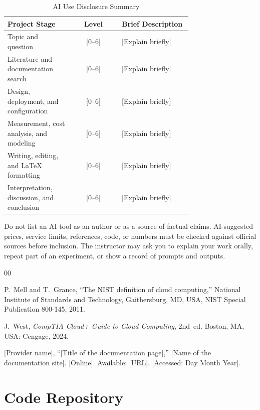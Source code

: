 \documentclass[conference,a4paper]{IEEEtran}
\begin{document}
	\begin{table}[htbp]
		\caption{AI Use Disclosure Summary}
		\label{tab:ai_use}
		\centering
		\footnotesize
		\begin{tabular}{|p{0.35\linewidth}|c|p{0.38\linewidth}|}
			\hline
			\textbf{Project Stage} & \textbf{Level} & \textbf{Brief Description} \\
			\hline
			Topic and question & [0--6] & [Explain briefly] \\
			\hline
			Literature and documentation search & [0--6] & [Explain briefly] \\
			\hline
			Design, deployment, and configuration & [0--6] & [Explain briefly] \\
			\hline
			Measurement, cost analysis, and modeling & [0--6] & [Explain briefly] \\
			\hline
			Writing, editing, and LaTeX formatting & [0--6] & [Explain briefly] \\
			\hline
			Interpretation, discussion, and conclusion & [0--6] & [Explain briefly] \\
			\hline
		\end{tabular}
	\end{table}
	
	Do not list an AI tool as an author or as a source of factual claims. AI-suggested prices, service limits, references, code, or numbers must be checked against official sources before inclusion. The instructor may ask you to explain your work orally, repeat part of an experiment, or show a record of prompts and outputs.
	
	\begin{thebibliography}{00}
		
		 P.~Mell and T.~Grance, ``The NIST definition of cloud computing,'' National Institute of Standards and Technology, Gaithersburg, MD, USA, NIST Special Publication 800-145, 2011.
		
		 J.~West, \textit{CompTIA Cloud+ Guide to Cloud Computing}, 2nd~ed. Boston, MA, USA: Cengage, 2024.
		
		 [Provider name], ``[Title of the documentation page],'' [Name of the documentation site]. [Online]. Available: [URL]. [Accessed: Day Month Year].
		
	\end{thebibliography}
	
	\appendix
	
	\section{Code Repository}
	\label{app:code}
	
\end{document}
